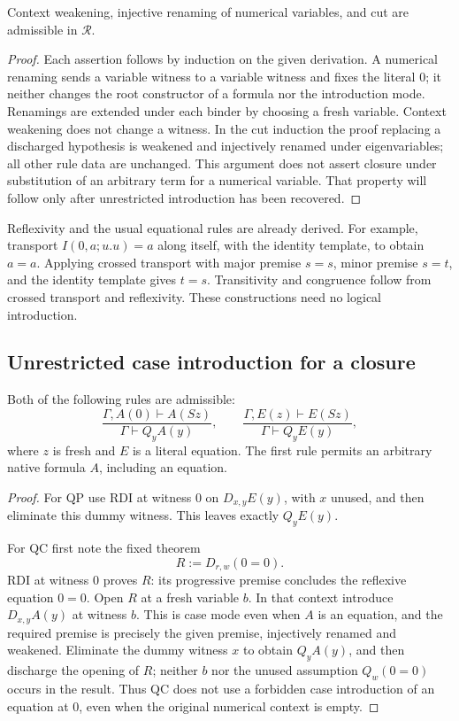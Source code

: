 \begin{lemma}
Context weakening, injective renaming of numerical variables, and cut are
admissible in $\mathcal R$.
\end{lemma}
\begin{proof}
Each assertion follows by induction on the given derivation.  A numerical
renaming sends a variable witness to a variable witness and fixes the
literal $0$; it neither changes the root constructor of a formula nor the
introduction mode.  Renamings are extended under each binder by choosing a
fresh variable.  Context weakening does not change a witness.  In the cut
induction the proof replacing a discharged hypothesis is weakened and
injectively renamed under eigenvariables; all other rule data are
unchanged.  This argument does not assert closure under substitution of an
arbitrary term for a numerical variable.  That property will follow only
after unrestricted introduction has been recovered.
\end{proof}

Reflexivity and the usual equational rules are already derived.  For
example, transport $I(0,a;u.u)=a$ along itself, with the identity template,
to obtain $a=a$.  Applying crossed transport with major premise $s=s$,
minor premise $s=t$, and the identity template gives $t=s$.
Transitivity and congruence follow
from crossed transport and reflexivity.  These constructions need no
logical introduction.

\subsection{Unrestricted case introduction for a closure}

\begin{lemma}
Both of the following rules are admissible:
\[
 \frac{\Gamma,A(0)\vdash A(Sz)}{\Gamma\vdash Q_yA(y)},
 \qquad
 \frac{\Gamma,E(z)\vdash E(Sz)}{\Gamma\vdash Q_yE(y)},
 \tag{QC, QP}
\]
where $z$ is fresh and $E$ is a literal equation.  The first rule permits
an arbitrary native formula $A$, including an equation.
\end{lemma}
\begin{proof}
For QP use RDI at witness $0$ on $D_{x,y}E(y)$, with $x$ unused, and
then eliminate this dummy witness.  This leaves exactly $Q_yE(y)$.

For QC first note the fixed theorem
\[
 R:=D_{r,w}(0=0).
\]
RDI at witness $0$ proves $R$: its progressive premise concludes the
reflexive equation $0=0$.  Open $R$ at a fresh variable $b$.  In that
context introduce $D_{x,y}A(y)$ at witness $b$.  This is case mode even
when $A$ is an equation, and the required premise is precisely the given
premise, injectively renamed and weakened.  Eliminate the dummy witness
$x$ to obtain $Q_yA(y)$, and then discharge the opening of $R$; neither
$b$ nor the unused assumption $Q_w(0=0)$ occurs in the result.  Thus QC
does not use a forbidden case introduction of an equation at $0$, even
when the original numerical context is empty.
\end{proof}

